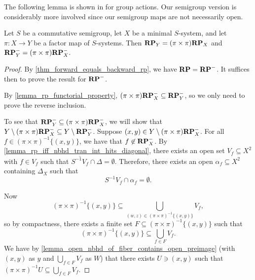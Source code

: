 The following lemma is shown in \cite[V. 2.12 and 2.14, pg. 416]{devries_book_1993} for group actions.  Our semigroup version is considerably more involved since our semigroup maps are not necessarily open.

\begin{theorem}
    \label{lemma_frp_functorial_property_minimal}
    \label{lemma_rp_functorial_property_minimal}
    Let $S$ be a commutative semigroup, let $X$ be a minimal $S$-system, and let $\pi: X \to Y$ be a factor map of $S$-systems.  Then $\mathbf{RP}_Y = (\pi \times \pi) \mathbf{RP}_X$ and $\mathbf{RP}^-_Y = (\pi \times \pi) \mathbf{RP}^-_X$.
\end{theorem}

\begin{proof}
    By \cref{thm_forward_equals_backward_rp}, we have $\mathbf{RP} = \mathbf{RP}^-$.  It suffices then to prove the result for $\mathbf{RP}^-$.

        By \cref{lemma_rp_functorial_property}, $(\pi \times \pi) \mathbf{RP}^-_X \subseteq \mathbf{RP}^-_Y$, so we only need to prove the reverse inclusion.

    To see that $\mathbf{RP}^-_Y \subseteq (\pi \times \pi) \mathbf{RP}^-_X$, we will show that $Y \setminus (\pi \times \pi) \mathbf{RP}^-_X \subseteq Y \setminus \mathbf{RP}^-_Y$.  Suppose $(x,y) \in Y \setminus (\pi \times \pi) \mathbf{RP}^-_X$.  For all $f \in (\pi \times \pi)^{-1} \{(x,y)\}$, we have that $f \not\in \mathbf{RP}^-_X$.  By \cref{lemma_rp_iff_nbhd_tran_int_hits_diagonal}, there exists an open set $V_{f} \subseteq X^2$ with $f \in V_{f}$ such that $\overline{S^{-1}V_{f}} \cap \Delta = \emptyset$. Therefore, there exists an open $\alpha_f \subseteq X^2$ containing $\Delta_X$ such that
    \[S^{-1}V_{f} \cap \alpha_f = \emptyset.\]

    Now
    \[(\pi \times \pi)^{-1} \{(x,y)\} \subseteq \bigcup_{(w,z) \in (\pi \times \pi)^{-1} \{(x,y)\}} V_{f},\]
    so by compactness, there exists a finite set $F \subseteq (\pi \times \pi)^{-1} \{(x,y)\}$ such that
    \[(\pi \times \pi)^{-1} \{(x,y)\} \subseteq \bigcup_{f \in F} V_{f}.\]
    We have by \cref{lemma_open_nbhd_of_fiber_contains_open_preimage} (with $(x,y)$ as $y$ and $\bigcup_{f \in F} V_{f}$ as $W$) that there exists $U \ni (x,y)$ such that $(\pi \times \pi)^{-1} U \subseteq \bigcup_{f \in F} V_{f}$.


\end{proof}
